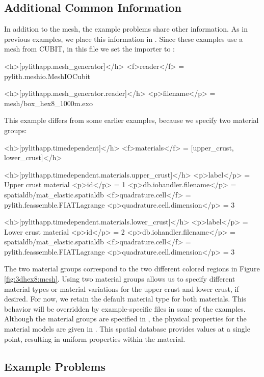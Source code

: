 \subsection{Additional Common Information}

In addition to the mesh, the example problems share other information.
As in previous examples, we place this information in .
Since these examples use a mesh from CUBIT, in this file we set the
importer to :
\begin{cfg}
<h>[pylithapp.mesh_generator]</h>
<f>reader</f> = pylith.meshio.MeshIOCubit

<h>[pylithapp.mesh_generator.reader]</h>
<p>filename</p> = mesh/box_hex8_1000m.exo
\end{cfg}
This example differs from some earlier examples, because we specify
two material groups:
\begin{cfg}
<h>[pylithapp.timedependent]</h>
<f>materials</f> = [upper_crust, lower_crust]</h>

<h>[pylithapp.timedependent.materials.upper_crust]</h>
<p>label</p> = Upper crust material
<p>id</p> = 1
<p>db.iohandler.filename</p> = spatialdb/mat_elastic.spatialdb
<f>quadrature.cell</f> = pylith.feassemble.FIATLagrange
<p>quadrature.cell.dimension</p> = 3

<h>[pylithapp.timedependent.materials.lower_crust]</h>
<p>label</p> = Lower crust material
<p>id</p> = 2
<p>db.iohandler.filename</p> = spatialdb/mat\_elastic.spatialdb
<f>quadrature.cell</f> = pylith.feassemble.FIATLagrange
<p>quadrature.cell.dimension</p> = 3
\end{cfg}
The two material groups correspond to the two different colored regions
in Figure \vref{fig:3dhex8:mesh}. Using two material groups allows
us to specify different material types or material variations for
the upper crust and lower crust, if desired. For now, we retain the
default  material type for both materials.
This behavior will be overridden by example-specific
files in some of the examples. Although the material groups are specified
in , the physical properties for the material
models are given in  
. This spatial database provides values
at a single point, resulting in uniform properties within the material.


\subsection{Example Problems}

